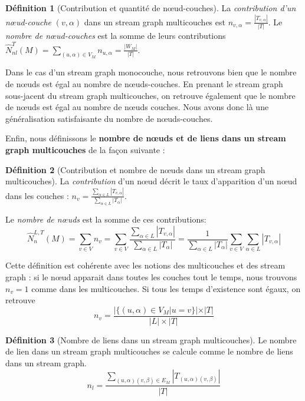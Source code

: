 \documentclass[11pt,a4paper]{article}
\theoremstyle{definition}
\newtheorem{defn}{Définition}
\theoremstyle{remark}
\theoremstyle{remark}
\def \stg {stream graph}
\def \stgm {stream graph multicouches}
\begin{document}
	\begin{defn}[Contribution et quantité de nœud-couches]
	La {\em contribution d'un n\oe{}ud-couche} $(v,\alpha)$ dans un \stgm{} est $n_{v,\alpha} = \frac{|T_{v,\alpha}|}{|T|}$. Le {\em nombre de nœud-couches} est la somme de leurs contributions $\hat{N}^{T}_{nl}(M) = \underset{(u,\alpha)\in V_M}{\sum} n_{u,\alpha} = \frac{|W_M|}{|T|}$.
    \end{defn}
	
	Dans le cas d'un \stg{} monocouche, nous retrouvons bien que le nombre de n\oe{}uds est égal au nombre de n\oe{}uds-couches. En prenant le \stg{} sous-jacent du \stgm{}, on retrouve également que le nombre de n\oe{}uds est égal au nombre de n\oe{}uds couches. Nous avons donc là une généralisation satisfaisante du nombre de n\oe{}uds-couches.
    
   Enfin, nous définissons le \textbf{nombre de n\oe{}uds et de liens dans un \stgm{}} de la façon suivante : 
    
    \begin{defn}[Contribution et nombre de n\oe{}uds dans un \stgm{}]
    La {\em contribution} d'un n\oe{}ud décrit le taux d'apparition d'un n\oe{}ud dans les couches : $n_v = \frac{\sum_{\alpha \in L}|T_{v,\alpha}|}{\sum_{\alpha \in L} |T_{\alpha}|}$.
    
    Le {\em nombre de n\oe{}uds} est la somme de ces contributions:
    \[
    \hat{N}^{L,T}_n(M) = \sum_{v\in V} n_v=\sum_{v\in V} \frac{\sum_{\alpha \in L}|T_{v,\alpha}|}{\sum_{\alpha \in L} |T_{\alpha}|} =\frac{1}{{\sum_{\alpha \in L} |T_{\alpha}|}}\sum_{v\in V} \sum_{\alpha \in L}|T_{v,\alpha}|
    \]
	
	\end{defn}
	
	Cette définition est cohérente avec les notions des multicouches et des \stg{} : si le n\oe{}ud apparait dans toutes les couches tout le temps, nous trouvons $n_v=1$ comme dans les multicouches. Si tous les temps d'existence sont égaux, on retrouve $$n_v=\frac{|\{(u,\alpha) \in V_M | u=v \}|  \times |T|}{|L|\times |T|}$$
	
	\begin{defn}[Nombre de liens dans un \stgm{}]
	    Le nombre de lien dans un \stgm{} se calcule comme le nombre de liens dans un \stg{}. $$n_l=\frac{\sum_{(u,\alpha)(v,\beta)\in E_M}|T_{(u,\alpha)(v,\beta)}|}{|T|}$$
	\end{defn}
	


	
\end{document}
